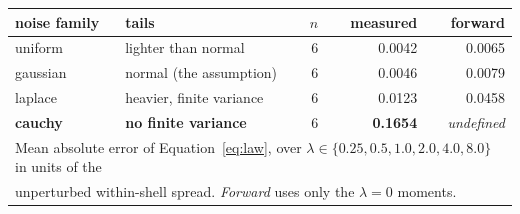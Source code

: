 \begin{tabular}{llrrr}
\toprule
noise family & tails & $n$ & measured & forward \\
\midrule
uniform & lighter than normal & 6 & 0.0042 & 0.0065 \\
gaussian & normal (the assumption) & 6 & 0.0046 & 0.0079 \\
laplace & heavier, finite variance & 6 & 0.0123 & 0.0458 \\
\textbf{cauchy} & \textbf{no finite variance} & 6 & \textbf{0.1654} & \emph{undefined} \\
\midrule
\multicolumn{5}{l}{Mean absolute error of Equation~\ref{eq:law}, over $\lambda \in \{0.25, 0.5, 1.0, 2.0, 4.0, 8.0\}$ in units of the} \\
\multicolumn{5}{l}{unperturbed within-shell spread. \emph{Forward} uses only the $\lambda\!=\!0$ moments.} \\
\bottomrule
\end{tabular}